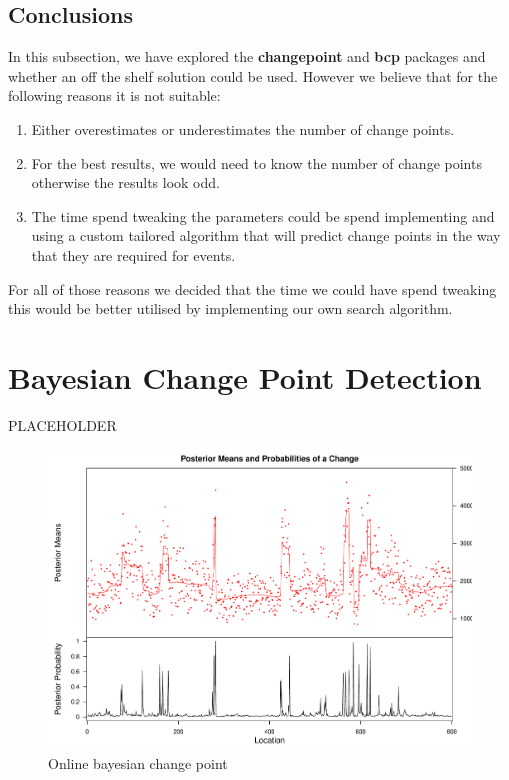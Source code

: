 \documentclass[minf,twoside,singlespacing,parskip,frontabs,notimes,12pt]{infthesis} %
\begin{document}
\newpage
\subsection{Conclusions}

In this subsection, we have explored the \textbf{changepoint} and \textbf{bcp} packages and whether an off the shelf solution could be used. However we believe that for the following reasons it is not suitable:
\begin{enumerate}
\item Either overestimates or underestimates the number of change points. 
\item For the best results, we would need to know the number of change points otherwise the results look odd.
\item The time spend tweaking the parameters could be spend implementing and using a custom tailored algorithm that will predict change points in the way that they are required for events. 
\end{enumerate}

For all of those reasons we decided that the time we could have spend tweaking this would be better utilised by implementing our own search algorithm. 


\section{Bayesian Change Point Detection}

PLACEHOLDER

\begin{figure}[]
\begin{center}
\includegraphics[width=\textwidth]{bcp}
\end{center}
\caption{Online bayesian change point}
\label{bcp}
\end{figure}
\end{document}
